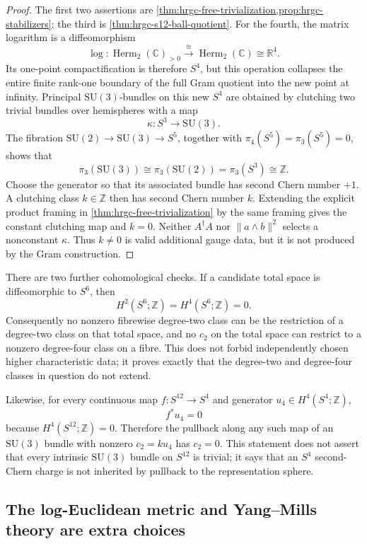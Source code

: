 \begin{proof}
The first two assertions are
\cref{thm:hrgc-free-trivialization,prop:hrgc-stabilizers}; the third is
\cref{thm:hrgc-s12-ball-quotient}.  For the fourth, the matrix logarithm is a
diffeomorphism
\[
 \log:\operatorname{Herm}_2(\mathbb C)_{>0}
 \xrightarrow{\ \cong\ }
 \operatorname{Herm}_2(\mathbb C)\cong\mathbb R^4.
\]
Its one-point compactification is therefore \(S^4\), but this operation
collapses the entire finite rank-one boundary of the full Gram quotient into
the new point at infinity.  Principal \(\mathrm{SU}(3)\)-bundles on this
new \(S^4\) are obtained by clutching two trivial bundles over hemispheres
with a map
\[
 \kappa:S^3\longrightarrow\mathrm{SU}(3).
\]
The fibration
\(\mathrm{SU}(2)\to\mathrm{SU}(3)\to S^5\), together with
\(\pi_4(S^5)=\pi_3(S^5)=0\), shows that
\[
 \pi_3(\mathrm{SU}(3))\cong\pi_3(\mathrm{SU}(2))
 =\pi_3(S^3)\cong\mathbb Z.
\]
Choose the generator so that its associated bundle has second Chern number
\(+1\).  A clutching class \(k\in\mathbb Z\) then has second Chern number
\(k\).  Extending the explicit product framing in
\cref{thm:hrgc-free-trivialization} by the same framing gives the constant
clutching map and \(k=0\).  Neither \(A^\dagger A\) nor
\(\lVert a\wedge b\rVert^2\) selects a nonconstant \(\kappa\).  Thus
\(k\ne0\) is valid additional gauge data, but it is not produced by the Gram
construction.
\end{proof}

There are two further cohomological checks.  If a candidate total space is
diffeomorphic to \(S^6\), then
\[
 H^2(S^6;\mathbb Z)=H^4(S^6;\mathbb Z)=0.
\]
Consequently no nonzero fibrewise degree-two class can be the restriction of
a degree-two class on that total space, and no \(c_2\) on the total space can
restrict to a nonzero degree-four class on a fibre.  This does not forbid
independently chosen higher characteristic data; it proves exactly that the
degree-two and degree-four classes in question do not extend.

Likewise, for every continuous map \(f:S^{12}\to S^4\) and generator
\(u_4\in H^4(S^4;\mathbb Z)\),
\[
 f^*u_4=0
\]
because \(H^4(S^{12};\mathbb Z)=0\).  Therefore the pullback along any such
map of an \(\mathrm{SU}(3)\) bundle with nonzero \(c_2=ku_4\) has
\(c_2=0\).  This statement does not assert that every intrinsic
\(\mathrm{SU}(3)\) bundle on \(S^{12}\) is trivial; it says that an
\(S^4\) second-Chern charge is not inherited by pullback to the
representation sphere.

\subsection{The log-Euclidean metric and Yang--Mills theory are extra choices}

